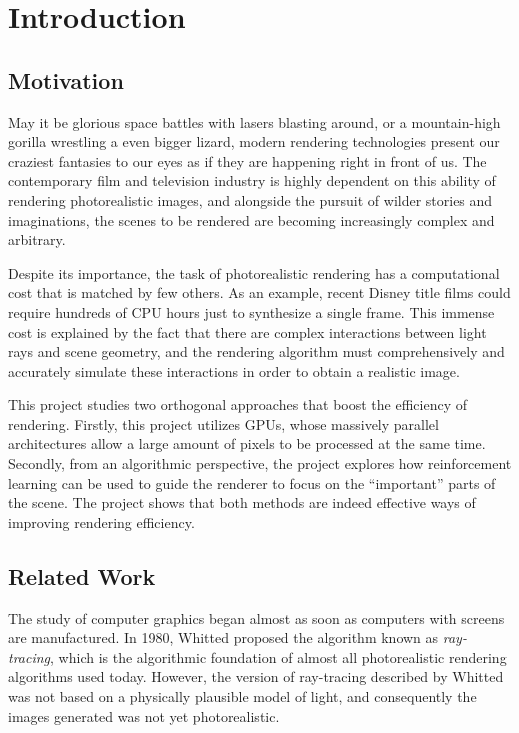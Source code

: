 \chapter{Introduction}

\section{Motivation}
May it be glorious space battles with lasers blasting around, or a mountain-high gorilla wrestling a even bigger lizard, modern rendering technologies present our craziest fantasies to our eyes as if they are happening right in front of us. The contemporary film and television industry is highly dependent on this ability of rendering photorealistic images, and alongside the pursuit of wilder stories and imaginations, the scenes to be rendered are becoming increasingly complex and arbitrary.

Despite its importance, the task of photorealistic rendering has a computational cost that is matched by few others. As an example, recent Disney title films could require hundreds of CPU hours just to synthesize a single frame\cite{hyperion}. This immense cost is explained by the fact that there are complex interactions between light rays and scene geometry, and the rendering algorithm must comprehensively and accurately simulate these interactions in order to obtain a realistic image. 

This project studies two orthogonal approaches that boost the efficiency of rendering. Firstly, this project utilizes GPUs, whose massively parallel architectures allow a large amount of pixels to be processed at the same time. Secondly, from an algorithmic perspective, the project explores how reinforcement learning can be used to guide the renderer to focus on the ``important'' parts of the scene. The project shows that both methods are indeed effective ways of improving rendering efficiency.

\section{Related Work}

The study of computer graphics began almost as soon as computers with screens are manufactured. In 1980, Whitted\cite{whitted} proposed the algorithm known as \textit{ray-tracing}, which is the algorithmic foundation of almost all photorealistic rendering algorithms used today. However, the version of ray-tracing described by Whitted was not based on a physically plausible model of light, and consequently the images generated was not yet photorealistic. 

